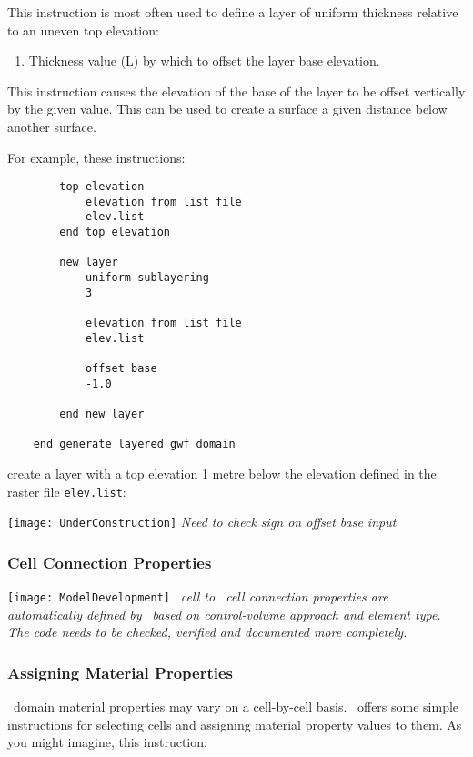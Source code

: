 {This instruction is most often used to define a layer of uniform thickness relative to an uneven top elevation:

    {\squish
    \begin{enumerate}
    \item {} Thickness value (L) by which to offset the layer base elevation.
    \end{enumerate}
    This instruction causes the elevation of the base of the layer to be offset vertically by the given value.  This
    can be used to create a surface a given distance below another surface.
}

    For example, these instructions:
\begin{verbatim}
        top elevation
            elevation from list file
            elev.list
        end top elevation

        new layer
            uniform sublayering
            3

            elevation from list file
            elev.list

            offset base
            -1.0

        end new layer

    end generate layered gwf domain
\end{verbatim}
 create a layer with a top elevation 1 metre below the elevation defined in the raster file \texttt{elev.list}:

\texttt{[image: UnderConstruction]} \textit{Need to check sign on \textsf{offset base} input}

\subsubsection{Cell Connection Properties}  \texttt{[image: ModelDevelopment]} \textit{
\gwf\ cell to \gwf\ cell connection properties are automatically defined by \mut\ based on control-volume approach and element type. The code needs to be checked, verified and documented more completely.}



\subsubsection{Assigning Material Properties}  

\gwf\ domain material properties may vary on a cell-by-cell  basis.  \mut\ offers some simple instructions for selecting cells and assigning material property values to them.  As you might imagine, this instruction:

}
